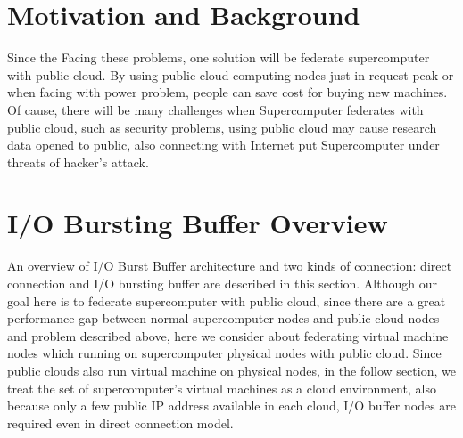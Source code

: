 \documentclass[JIP,draft]{ipsj}
\begin{document}
\section{Motivation and Background}

Since the 
Facing these problems, one solution will be federate supercomputer with public cloud.
By using public cloud computing nodes just in request peak or when facing with power problem, people can save cost for buying new machines.
Of cause, there will be many challenges when Supercomputer federates with public cloud, such as security problems, using public cloud may cause research data opened to public, also connecting with Internet put Supercomputer under threats of hacker's attack.


\section{I/O Bursting Buffer Overview}
An overview of I/O Burst Buffer architecture and two kinds of connection: direct connection and I/O bursting buffer are described in this section.
Although our goal here is to federate supercomputer with public cloud, since there are a great performance gap between normal supercomputer nodes and public cloud nodes and problem described above, here we consider about federating virtual machine nodes which running on supercomputer physical nodes with public cloud.
Since public clouds also run virtual machine on physical nodes, in the follow section, we treat the set of supercomputer's virtual machines as a cloud environment, also because only a few public IP address available in each cloud, I/O buffer nodes are required even in direct connection model.
\end{document}
